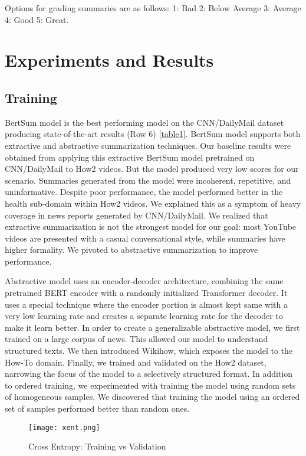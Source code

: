 \documentclass[sigconf]{acmart}
\begin{document}
Options for grading summaries are as follows: 1: Bad   2: Below Average   3: Average   4: Good   5: Great.




\section{Experiments and Results}
\label{Experiments}
\subsection{Training}

BertSum model is the best performing model on the CNN/DailyMail dataset producing state-of-the-art results (Row 6) \ref{table1}. BertSum model supports both extractive and abstractive summarization techniques. Our baseline results were obtained from applying this extractive BertSum model pretrained on CNN/DailyMail to How2 videos. But the model produced very low scores for our scenario. Summaries generated from the model were incoherent, repetitive, and uninformative. Despite poor performance, the model performed better in the health sub-domain within How2 videos. We explained this as a symptom of heavy coverage in news reports generated by CNN/DailyMail. We realized that extractive summarization is not the strongest model for our goal: most YouTube videos are presented with a casual conversational style, while summaries have higher formality. We pivoted to abstractive summarization to improve performance. 

Abstractive model uses an encoder-decoder architecture, combining the same pretrained BERT encoder with a randomly initialized Transformer decoder. It uses a special technique where the encoder portion is almost kept same with a very low learning rate and creates a separate learning rate for the decoder to make it learn better. In order to create a generalizable abstractive model, we first trained on a large corpus of news. This allowed our model to understand structured texts. We then introduced Wikihow, which exposes the model to the How-To domain. Finally, we trained and validated on the How2 dataset, narrowing the focus of the model to a selectively structured format. In addition to ordered training, we experimented with training the model using random sets of homogeneous samples. We discovered that training the model using an ordered set of samples performed better than random ones.


\begin{figure}
  \centering
  \texttt{[image: xent.png]}
  \caption{Cross Entropy: Training vs Validation}
  \label{fig:xent}
\end{figure}
\end{document}
